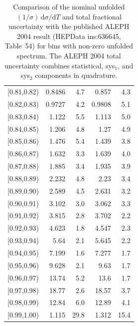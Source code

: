 \begin{table}[t!]
\begin{tabular}{c r r r r}
{[0.81,0.82)} & 0.8486 & 4.7 & 0.857 & 4.3 \\
{[0.82,0.83)} & 0.9727 & 4.2 & 0.9808 & 5.1 \\
{[0.83,0.84)} & 1.122 & 5.5 & 1.113 & 5.0 \\
{[0.84,0.85)} & 1.206 & 4.8 & 1.27 & 4.9 \\
{[0.85,0.86)} & 1.476 & 5.4 & 1.439 & 3.8 \\
{[0.86,0.87)} & 1.632 & 3.3 & 1.639 & 4.0 \\
{[0.87,0.88)} & 1.885 & 3.4 & 1.935 & 3.9 \\
{[0.88,0.89)} & 2.232 & 4.8 & 2.23 & 3.4 \\
{[0.89,0.90)} & 2.589 & 4.5 & 2.631 & 3.2 \\
{[0.90,0.91)} & 3.102 & 3.0 & 3.062 & 3.3 \\
{[0.91,0.92)} & 3.815 & 2.8 & 3.702 & 2.2 \\
{[0.92,0.93)} & 4.623 & 1.8 & 4.547 & 2.3 \\
{[0.93,0.94)} & 5.64 & 2.1 & 5.645 & 2.2 \\
{[0.94,0.95)} & 7.199 & 1.6 & 7.277 & 1.7 \\
{[0.95,0.96)} & 9.628 & 2.1 & 9.63 & 1.7 \\
{[0.96,0.97)} & 13.74 & 5.2 & 13.6 & 1.7 \\
{[0.97,0.98)} & 18.77 & 2.6 & 18.57 & 3.7 \\
{[0.98,0.99)} & 12.84 & 6.0 & 12.89 & 4.1 \\
{[0.99,1.00)} & 1.115 & 29.8 & 1.312 & 15.4 \\
\hline
\end{tabular}
\normalsize
\caption{Comparison of the nominal unfolded $(1/\sigma)\,\mathrm{d}\sigma/\mathrm{d}T$ and total fractional uncertainty with the published ALEPH 2004 result (HEPData ins:636645, Table~54) for bins with non-zero unfolded spectrum. The ALEPH 2004 total uncertainty combines statistical, sys$_1$, and sys$_2$ components in quadrature.}
\label{tab:per_bin_uncertainty_aleph}
\end{table}
